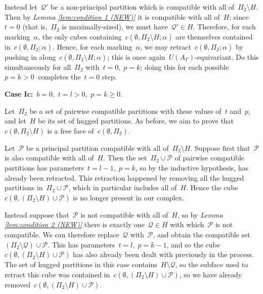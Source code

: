 \documentclass[11pt]{amsart}
\theoremstyle{definition}
\theoremstyle{definition}
\theoremstyle{definition}
\theoremstyle{definition}
\newcommand{\calQ}{\mathcal{Q}}
\newcommand{\calP}{\mathcal{P}} %
\newcommand{\uag}{U(A_{\Gamma})} %
\begin{document}
Instead let~$\calQ'$ be a non-principal partition which is compatible with all of~$\Pi_2 \setminus H$. Then by \textit{Lemma \ref{lem:condition 1 (NEW)}} it is compatible with all of~$H$; since~$t = 0$ (that is,~$\Pi_2$ is maximally-sized), we must have~$\calQ' \in H$. Therefore, for each marking~$\alpha$, the only cubes containing~$c(\emptyset, \Pi_2 \setminus H; \alpha)$ are themselves contained in~$c(\emptyset, \Pi_2; \alpha)$. Hence, for each marking~$\alpha$, we may retract~$c(\emptyset, \Pi_2; \alpha)$ by pushing in along~$c(\emptyset, \Pi_2 \setminus H; \alpha)$; this is once again~$\uag$-equivariant. Do this simultaneously for all~$\Pi_2$ with~$t = 0,\; p = k$; doing this for each possible~$p = k > 0~$ completes the~$t = 0$ step.

\textbf{Case Ic:}~$b = 0$,~$t = l > 0$,~$p = k \geq 0$. 

Let~$\Pi_2$ be a set of pairwise compatible partitions with these values of~$t$ and~$p$, and let~$H$ be its set of hugged partitions. As before, we aim to prove that~$c(\emptyset, \Pi_2 \setminus H)$ is a free face of~$c(\emptyset, \Pi_2)$. 

Let~$\calP$ be a principal partition compatible with all of~$\Pi_2 \setminus H$. Suppose first that~$\calP$ is also compatible with all of~$H$. Then the set~$\Pi_2 \cup \calP$ of pairwise compatible partitions has parameters~$t = l-1,\; p = k$, so by the inductive hypothesis, has already been retracted. This retraction happened by removing all the hugged partitions in~$\Pi_2 \cup \calP$, which in particular includes all of~$H$. Hence the cube~$c(\emptyset, (\Pi_2 \setminus H) \cup \calP)$ is no longer present in our complex. 

Instead suppose that~$\calP$ is not compatible with all of~$H$, so by \textit{Lemma \ref{lem:condition 2 (NEW)}} there is exactly one~$\calQ \in H$ with which~$\calP$ is not compatible. We can therefore replace~$\calQ$ with~$\calP$, and obtain the compatible set~$(\Pi_2 \setminus \calQ) \cup \calP$. This has parameters~$t = l,\; p = k-1$, and so the cube~$c(\emptyset, (\Pi_2 \setminus H) \cup \calP)$ has also already been dealt with previously in the process. The set of hugged partitions in this case contains~$H \setminus \calQ$, so the subface used to retract this cube was contained in~$c(\emptyset, (\Pi_2 \setminus H) \cup \calP)$, so we have already removed~$c(\emptyset, (\Pi_2 \setminus H) \cup \calP)$.
\end{document}

